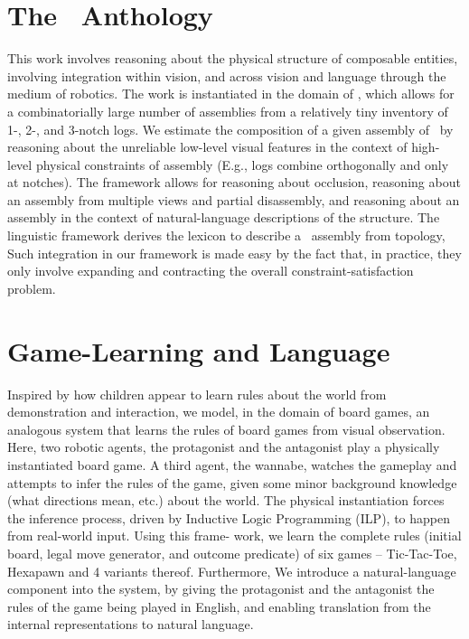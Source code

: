 \section{The \LincolnLogs\ Anthology}
This work involves reasoning about the physical structure of composable
entities, involving integration within vision, and across vision and language
through the medium of robotics.
%
The work is instantiated in the domain of \LincolnLogs, which allows for a
combinatorially large number of assemblies from a relatively tiny inventory of
1-, 2-, and 3-notch logs.
%
We estimate the composition of a given assembly of \LincolnLogs\ by reasoning
about the unreliable low-level visual features in the context of high-level
physical constraints of assembly (E.g., logs combine orthogonally and only at
notches).
%
The framework allows for reasoning about occlusion, reasoning about an assembly
from multiple views and partial disassembly, and reasoning about an assembly in
the context of natural-language descriptions of the structure.
%
The linguistic framework derives the lexicon to describe a \LincolnLog\
assembly from topology, Such integration in our framework is made easy by the
fact that, in practice, they only involve expanding and contracting the overall
constraint-satisfaction problem.

\section{Game-Learning and Language}
Inspired by how children appear to learn rules about the world from
demonstration and interaction, we model, in the domain of board games, an
analogous system that learns the rules of board games from visual
observation.
%
Here, two robotic agents, the protagonist and the antagonist play a physically
instantiated board game.
%
A third agent, the wannabe, watches the gameplay and attempts to infer the
rules of the game, given some minor background knowledge (what directions mean,
etc.) about the world.
%
The physical instantiation forces the inference process, driven by Inductive
Logic Programming (ILP), to happen from real-world input.
%
Using this frame- work, we learn the complete rules (initial board, legal move
generator, and outcome predicate) of six games -- Tic-Tac-Toe, Hexapawn and 4
variants thereof.
%
Furthermore, We introduce a natural-language component into the system, by
giving the protagonist and the antagonist the rules of the game being played in
English, and enabling translation from the internal representations to natural
language.

